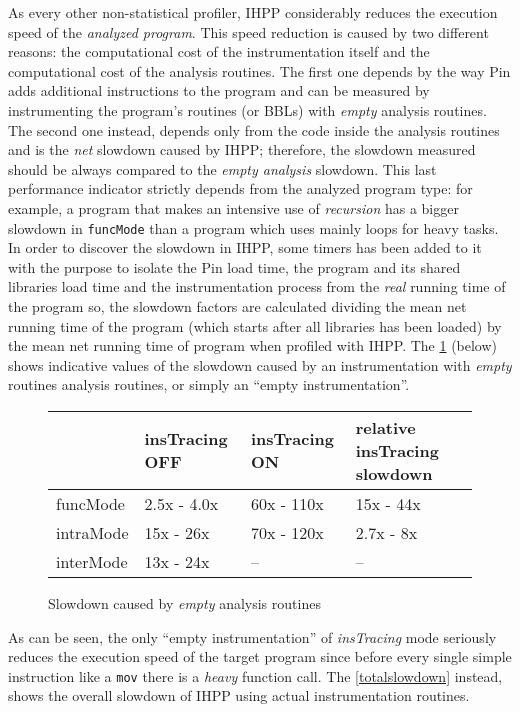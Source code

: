 \documentclass[a4paper,10pt]{report}
\begin{document}
As every other non-statistical profiler, IHPP considerably reduces the execution
speed of the \emph{analyzed program}. This speed reduction is caused by two different
reasons: the computational cost of the instrumentation itself and the computational
cost of the analysis routines. The first one depends by the way Pin
adds additional instructions to the program and can be measured by
instrumenting the program's routines (or BBLs) with \emph{empty} analysis routines.
The second one instead, depends only from the code inside the analysis routines
and is the \emph{net} slowdown caused by IHPP; therefore, the
slowdown measured should be always compared to the \emph{empty analysis} slowdown.
This last performance indicator strictly depends from the analyzed program type:
for example, a program that makes an intensive use
of \emph{recursion} has a bigger slowdown in \verb|funcMode|
than a program which uses mainly loops for heavy tasks.
In order to discover the slowdown in IHPP,
some timers has been added to it with the purpose to isolate
the Pin load time, the program and its shared libraries load time
and the instrumentation process from the \emph{real} running time of the program
so, the slowdown factors are calculated dividing the mean net running time
of the program (which starts after all libraries has been loaded) by the mean
net running time of program when profiled with IHPP.
The \cref{emptyslowdown} (below) shows indicative values of the slowdown
caused by an instrumentation with \emph{empty} routines analysis routines,
or simply an ``empty instrumentation''.

\begin{figure}[H]

\centering

{\renewcommand{\arraystretch}{1.2}
\renewcommand{\tabcolsep}{0.2cm}
\begin{tabular}{l|l|l|l}
& insTracing OFF & insTracing ON & relative insTracing slowdown\\
\hline
funcMode & 2.5x - 4.0x & 60x - 110x & 15x - 44x\\
intraMode & 15x - 26x & 70x - 120x & 2.7x - 8x\\
interMode & 13x - 24x & -- & --\\
\end{tabular}}


\caption{Slowdown caused by \emph{empty} analysis routines}
\label{emptyslowdown}
\end{figure}

\noindent
As can be seen, the only ``empty instrumentation'' of \emph{insTracing} mode
seriously reduces the execution speed of the target program since
before every single simple instruction like a \verb|mov| there is a \emph{heavy}
function call. The \cref{totalslowdown} instead, shows the overall slowdown of IHPP
using actual instrumentation routines.
\end{document}
